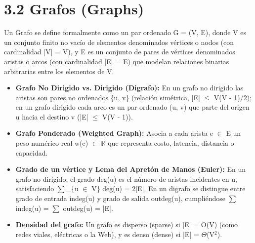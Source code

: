 \documentclass[11pt,letterpaper]{article}
\begin{document}
\section*{3.2 Grafos (Graphs)}
Un Grafo se define formalmente como un par ordenado G = (V, E), donde V es un conjunto finito no vacío de elementos denominados vértices o nodos (con cardinalidad |V| = V), y E es un conjunto de pares de vértices denominados aristas o arcos (con cardinalidad |E| = E) que modelan relaciones binarias arbitrarias entre los elementos de V.\par
\begin{itemize}
\setlength{\itemsep}{2pt}\setlength{\parskip}{0pt}
  \item \textbf{Grafo No Dirigido vs. Dirigido (Digrafo): }En un grafo no dirigido las aristas son pares no ordenados \{u, v\} (relación simétrica, |E| $\le$ V(V - 1)/2); en un grafo dirigido cada arco es un par ordenado (u, v) que parte del origen u hacia el destino v (|E| $\le$ V(V - 1)).
  \item \textbf{Grafo Ponderado (Weighted Graph): }Asocia a cada arista e $\in$ E un peso numérico real w(e) $\in$ $\mathbb{R}$ que representa costo, latencia, distancia o capacidad.
  \item \textbf{Grado de un vértice y Lema del Apretón de Manos (Euler): }En un grafo no dirigido, el grado deg(u) es el número de aristas incidentes en u, satisfaciendo $\sum$\_\{u $\in$ V\} deg(u) = 2|E|. En un digrafo se distingue entre grado de entrada indeg(u) y grado de salida outdeg(u), cumpliéndose $\sum$ indeg(u) = $\sum$ outdeg(u) = |E|.
  \item \textbf{Densidad del grafo: }Un grafo es disperso (sparse) si |E| = O(V) (como redes viales, eléctricas o la Web), y es denso (dense) si |E| = $\Theta$(V$^2$).
\end{itemize}
\end{document}
